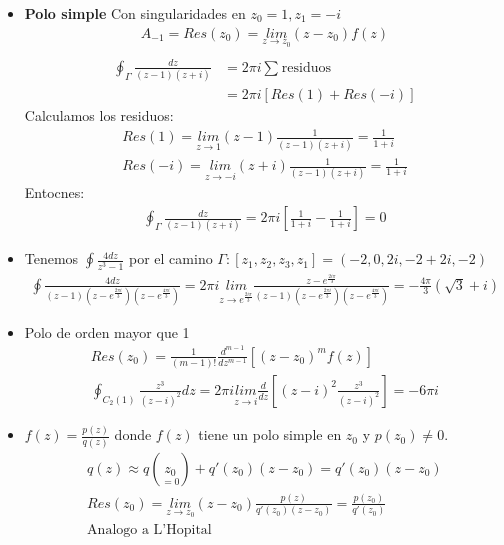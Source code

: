 \documentclass{article}
\begin{document}
\begin{itemize}
  \item \textbf{Polo simple } Con singularidades en $ z_0 = 1, z_1 = -i $
    \begin{gather*}
      A _{-1 } = Res(z_0 ) = \underset{z  \rightarrow z_0 }{lim}(z-z_0 )f(z) \\
    \end{gather*}
    \begin{align*}
      \displaystyle\oint_{\Gamma}^{} \frac{dz }{(z-1)(z+i)} &= 2\pi i \displaystyle\sum_{}^{}\text{residuos }\\
      &= 2\pi i [Res(1)+Res(-i )]
    \end{align*}
    Calculamos los residuos: 
    \begin{gather*}
      Res(1) = \underset{z  \rightarrow 1 }{lim}(z-1) \frac{1}{(z-1)(z+i )} = \frac{1}{1 + i }\\
      Res(-i) = \underset{z \rightarrow -i }{lim}(z+i) \frac{1}{(z-1)(z+i)} = \frac{1}{1+i }
    \end{gather*}
    Entocnes: 
    \begin{gather*}
       \displaystyle\oint_{\Gamma}^{} \frac{dz }{(z-1)(z+i)} = 2 \pi i \left[\frac{1}{1+i } - \frac{1}{1+i }\right] = 0 
    \end{gather*}

  \item Tenemos $ \oint \frac{4 dz }{z ^ {3 } - 1 } $ por el camino $ \Gamma: [z_1,z_2,z_3,z_1] = (-2,0,2i,-2+2i,-2) $
\begin{gather*}
  \oint \frac{4 dz }{(z - 1 )(z- e ^ {\frac{2\pi i }{3 }})(z - e ^ {\frac{4\pi i }{3 }})} = 2\pi i \underset{z  \rightarrow e ^ {\frac{2 i \pi}{3 }}}{lim}\frac{z - e ^ {\frac{2i\pi}{3 }}}{(z - 1 )(z- e ^ {\frac{2\pi i }{3 }})(z - e ^ {\frac{4\pi i }{3 }})} = -\frac{4\pi}{3}(\sqrt{3 } + i )
\end{gather*}
  \item Polo de orden mayor que 1 
    \begin{gather*}
      Res(z_0) = \frac{1}{(m-1)! } \frac{d  ^ {m-1 } }{d z ^ {m-1 }} \left[(z-z_0 )^m f(z) \right] \\
      \displaystyle\oint_{C_2(1) }^{} \frac{z ^ {3 }}{(z-i)^2 }dz = 2\pi i \underset{z  \rightarrow i }{lim}\frac{d  }{d z } \left[(z-i)^2 \frac{z ^3 }{(z-i)^2 }\right] = -6 \pi i 
    \end{gather*}

  \item $ f(z) = \frac{p(z) }{q(z) } $ donde $ f(z)  $ tiene un polo simple en $ z_0  $ y $ p(z_0) \neq 0  $.
    \begin{gather*}
      q(z) \approx q (\underset{=0 }{z_0 }) + q'(z_0)(z-z_0) = q'(z_0)(z-z_0)\\
      Res(z_0) = \underset{z  \rightarrow z_0 }{lim}(z-z_0) \frac{p(z) }{q'(z_0)(z-z_0)} = \frac{p(z_0 )}{q'(z_0 )}\\
      \text{Analogo a L'Hopital}
    \end{gather*}
\end{itemize}
\end{document}
